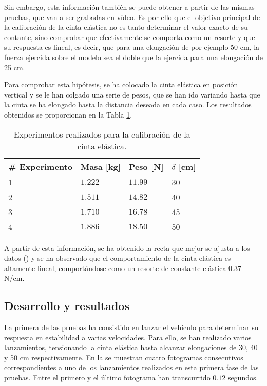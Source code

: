 Sin embargo, esta información también se puede obtener a partir de las mismas pruebas, que van a ser grabadas en vídeo. Es por ello que el objetivo principal de la calibración de la cinta elástica no es tanto determinar el valor exacto de su contante, sino comprobar que efectivamente se comporta como un resorte y que su respuesta es lineal, es decir, que para una elongación de por ejemplo 50 cm, la fuerza ejercida sobre el modelo sea el doble que la ejercida para una elongación de 25 cm.

Para comprobar esta hipótesis, se ha colocado la cinta elástica en posición vertical y se le han colgado una serie de pesos, que se han ido variando hasta que la cinta se ha elongado hasta la distancia deseada en cada caso. Los resultados obtenidos se proporcionan en la Tabla \ref{tab:cintaelastica}.

\begin{table}[ht]
\centering
\caption{Experimentos realizados para la calibración de la cinta elástica.}
\label{tab:cintaelastica}
\begin{tabular}{llll}
\toprule
\# Experimento & Masa [kg]       & Peso [N]       & $\delta$ [cm] \\ \midrule
1              & $1.222$         & $11.99$        & 30          \\
2              & $1.511$         & $14.82$        & 40          \\
3              & $1.710$         & $16.78$        & 45          \\
4              & $1.886$         & $18.50$        & 50         \\ \bottomrule
\end{tabular}
\end{table}

A partir de esta información, se ha obtenido la recta que mejor se ajusta a los datos () y se ha observado que el comportamiento de la cinta elástica es altamente lineal, comportándose como un resorte de constante elástica $0.37$ N/cm.


\subsection{Desarrollo y resultados}
\label{sec:tests:results}

La primera de las pruebas ha consistido en lanzar el vehículo para determinar su respuesta en estabilidad a varias velocidades. Para ello, se han realizado varios lanzamientos, tensionando la cinta elástica hasta alcanzar elongaciones de 30, 40 y 50 cm respectivamente. En la  se muestran cuatro fotogramas consecutivos correspondientes a uno de los lanzamientos realizados en esta primera fase de las pruebas. Entre el primero y el último fotograma han transcurrido $0.12$ segundos.


